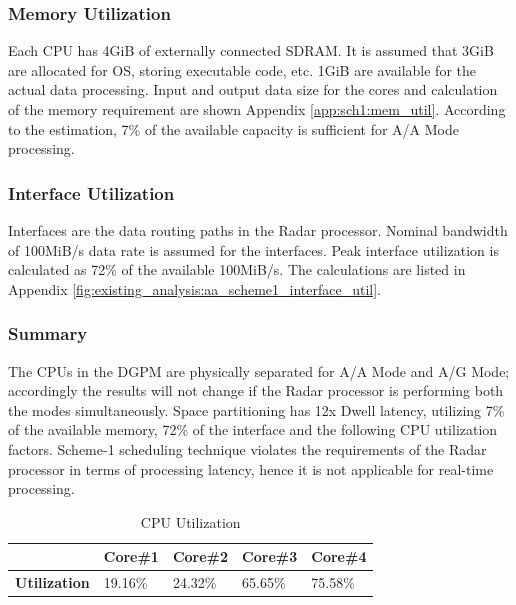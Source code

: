 \subsubsection{Memory Utilization}
\label{sec:scheme1:mem_util}
Each CPU has 4GiB of externally connected SDRAM. It is assumed that 3GiB are allocated for OS, storing executable code, etc. 1GiB are available for the actual data processing. Input and output data size for the cores and calculation of the memory requirement are shown Appendix \ref{app:sch1:mem_util}. According to the estimation, 7\% of the available capacity is sufficient for A/A Mode processing.

\subsubsection{Interface Utilization}
\label{sec:scheme1:aa_interface_util}
Interfaces are the data routing paths in the Radar processor. Nominal bandwidth of 100MiB/s data rate is assumed for the interfaces.  Peak interface utilization is calculated as 72\% of the available 100MiB/s. The calculations are listed in Appendix \ref{fig:existing_analysis:aa_scheme1_interface_util}.

\subsubsection{Summary}
The CPUs in the DGPM are physically separated for A/A Mode and A/G Mode; accordingly the results will not change if the Radar processor is performing both the modes simultaneously. Space partitioning has 12x Dwell latency, utilizing 7\% of the available memory, 72\% of the interface and the following CPU utilization factors. Scheme-1 scheduling technique violates the requirements of the Radar processor in terms of processing latency, hence it is not applicable for real-time processing.

\begin{table}[h!]
	\centering
	\begin{tabular}{|l|l|l|l|l|} 
	 \hline
	& \textbf{Core\#1} & \textbf{Core\#2} & \textbf{Core\#3} & \textbf{Core\#4} \\ \hline
	\textbf{Utilization} & 19.16\% & 24.32\% & 65.65\% & 75.58\% \\ \hline
	\end{tabular}
	\caption{CPU Utilization}
\end{table}

